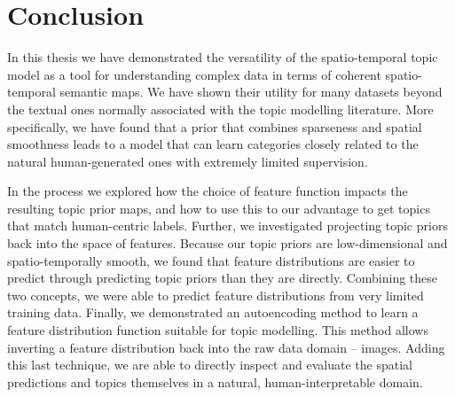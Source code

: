 
\chapter{Conclusion}

In this thesis we have demonstrated the versatility of the spatio-temporal topic model as a tool for understanding complex data in terms of coherent spatio-temporal semantic maps. We have shown their utility for many datasets  beyond the textual ones normally associated with the topic modelling literature. More specifically, we have found that a prior that combines sparseness and spatial smoothness leads to a model that can learn categories closely related to the natural human-generated ones with extremely limited supervision.

In the process  we explored how the choice of feature function impacts the resulting topic prior maps, and how to use this to our advantage to get topics that match human-centric labels. Further, we investigated projecting topic priors back into the space of features. Because our topic priors are low-dimensional and spatio-temporally smooth, we found that feature distributions are easier to predict through predicting topic priors than they are directly. Combining these two concepts, we were able to predict feature distributions from very limited training data. Finally,  we demonstrated an autoencoding method to learn a feature distribution function suitable for topic modelling. This method allows inverting a feature distribution back into the raw data domain -- images. Adding this last technique, we are able to directly inspect and evaluate the spatial predictions and topics themselves in a natural, human-interpretable domain.

